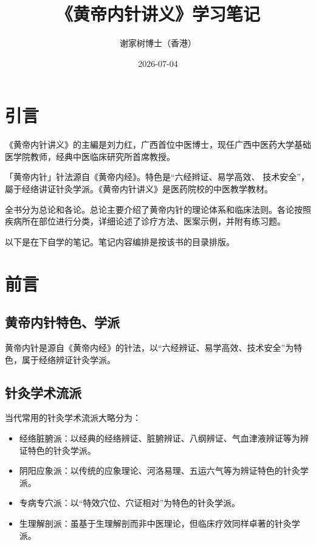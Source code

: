 \documentclass[
]{book}
\title{《黄帝内针讲义》学习笔记}
\author{谢家树博士（香港）}
\date{2026-07-04}
\begin{document}
\maketitle

{
\setcounter{tocdepth}{1}
\tableofcontents
}
\chapter*{引言}\label{ux5f15ux8a00}

《黄帝内针讲义》的主編是刘力红，广西首位中医博士，现任广西中医药大学基础医学院教师，经典中医临床研究所首席教授。

「黄帝内针」针法源自《黄帝内经》。特色是``六经辫证、易学高效、
技术安全''，屬于经络讲证针灸学派。《黄帝内针讲义》是医药院校的中医教学教材。

全书分为总论和各论。总论主要介绍了黄帝内针的理论体系和临床法则。各论按照疾病所在部位进行分类，详细论述了诊疗方法、医案示例，并附有练习题。

以下是在下自学的笔记。笔记内容编排是按该书的目录排版。

\chapter{前言}\label{ux524dux8a00}

\section{黄帝内针特色、学派}\label{ux9ec4ux5e1dux5185ux9488ux7279ux8272ux5b66ux6d3e}

黄帝内针是源自《黄帝内经》的针法，以``六经辨证、易学高效、技术安全''为特色，属于经络辨证针灸学派。

\section{针灸学术流派}\label{ux9488ux7078ux5b66ux672fux6d41ux6d3e}

当代常用的针灸学术流派大略分为：

\begin{itemize}
\item
  经络脏腑派：以经典的经络辨证、脏腑辨证、八纲辨证、气血津液辨证等为辨证特色的针灸学派。
\item
  阴阳应象派：以传统的应象理论、河洛易理、五运六气等为辨证特色的针灸学派。
\item
  专病专穴派：以``特效穴位、穴证相对''为特色的针灸学派。
\item
  生理解剖派：虽基于生理解剖而非中医理论，但临床疗效同样卓著的针灸学派。
\end{itemize}
\end{document}
